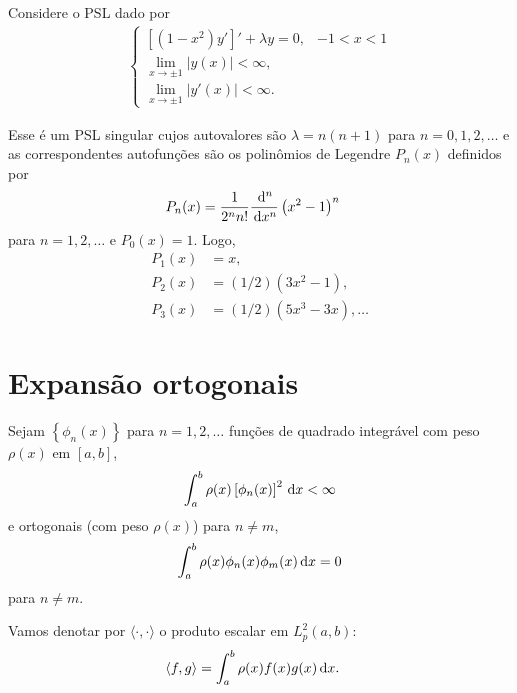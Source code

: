 \begin{exem}
    Considere o PSL dado por
    \begin{align*}
        \begin{cases}
            \left[ \left( 1 - x^2 \right) y' \right]' + \lambda y = 0, & -1 < x < 1 \\
            \lim_{x \to \pm 1} | y(x) | < \infty, \\
            \lim_{x \to \pm 1} | y'(x) | < \infty.
        \end{cases}
    \end{align*}

    Esse é um PSL singular cujos autovalores são $\lambda = n \left( n + 1 \right)$ para $n = 0, 1, 2, \ldots$ e as correspondentes autofunções são os polinômios de Legendre $P_n(x)$ definidos por
    \begin{align*}
        P_n(x) &= \frac{1}{2^n n!} \frac{\, \mathrm{d}^n}{\, \mathrm{d}x^n}\left( x^2 - 1 \right)^n
    \end{align*}
    para $n = 1, 2, \ldots$ e $P_0(x) = 1$. Logo,
    \begin{align*}
        P_1(x) &= x, \\
        P_2(x) &= \left( 1/2 \right) \left( 3 x^2 - 1 \right), \\
        P_3(x) &= \left( 1/2 \right) \left( 5 x^3 - 3 x \right), \ldots
    \end{align*}
\end{exem}

\section{Expansão ortogonais}
Sejam $\left\{ \phi_n(x) \right\}$ para $n = 1, 2, \ldots$ funções de quadrado integrável com peso $\rho(x)$ em $[a,b]$,
\begin{align*}
    \int_a^b \rho(x) \left[ \phi_n(x) \right]^2 \, \mathrm{d}x < \infty
\end{align*}
e ortogonais (com peso $\rho(x)$) para $n \neq m$,
\begin{align*}
    \int_a^b \rho(x) \phi_n(x) \phi_m(x) \, \mathrm{d}x = 0
\end{align*}
para $n \neq m$.

Vamos denotar por $\langle \cdot, \cdot \rangle$ o produto escalar em $L_p^2(a, b)$:
\begin{align*}
    \langle f,g \rangle &= \int_a^b \rho(x) f(x) g(x) \, \mathrm{d}x.
\end{align*}

